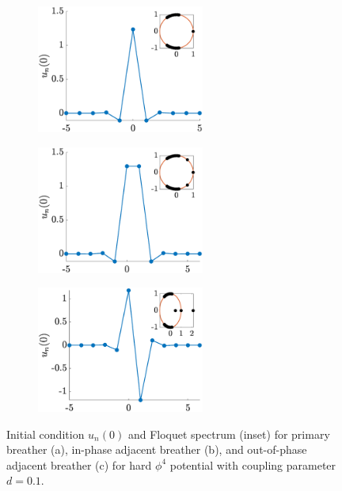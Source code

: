 \documentclass[12pt,reqno]{amsart}
\theoremstyle{definition}
\begin{document}
\begin{figure}
	\begin{center}
	\begin{subfigure}{0.3\linewidth}
		\caption{}
		\includegraphics[width=5.5cm]{phi4single.eps} \hspace{-0.5cm}
		\label{fig:phi4sola} 
	\end{subfigure}
	\begin{subfigure}{0.3\linewidth}
		\caption{}
		\includegraphics[width=5.5cm]{intersitephi4inphase.eps} \hspace{-0.5cm}
		\label{fig:phi4solb} 
	\end{subfigure}
	\begin{subfigure}{0.3\linewidth}
		\caption{}
		\includegraphics[width=5.5cm]{intersitephi4opposite.eps} 
		\label{fig:phi4solc} 
	\end{subfigure}
	\end{center}
	\caption{Initial condition $u_n(0)$ and Floquet spectrum (inset) for primary breather (a), in-phase adjacent breather (b), and out-of-phase adjacent breather (c) for hard $\phi^4$ potential with coupling parameter $d=0.1$. }
	\label{fig:phi4sol}
\end{figure}
\end{document}
